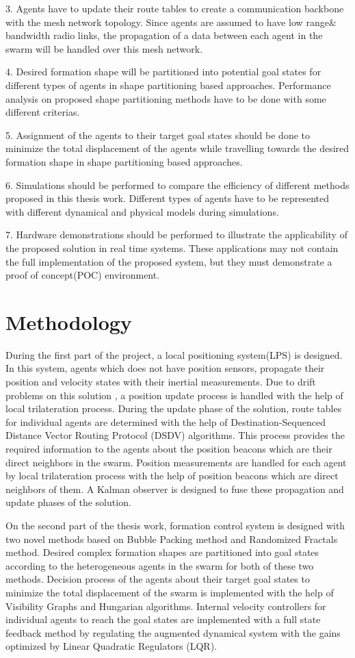 3. Agents have to update their route tables to create a communication backbone with the mesh network topology. Since agents are assumed to have low range$\&$bandwidth radio links, the propagation of a data between each agent in the swarm will be handled over this mesh network. 

4. Desired formation shape will be partitioned into potential goal states for different types of agents in shape partitioning based approaches. Performance analysis on proposed shape partitioning methods have to be done with some different criterias. 

5. Assignment of the agents to their target goal states should be done to minimize the total displacement of the agents while travelling towards the desired formation shape in shape partitioning based approaches. 

6. Simulations should be performed to compare the efficiency of different methods proposed in this thesis work. Different types of agents have to be represented with different dynamical and physical models during simulations.

7. Hardware demonstrations should be performed to illustrate the applicability of the proposed solution in real time systems. These applications may not contain the full implementation of the proposed system, but they must demonstrate a proof of concept(POC) environment.

\section{Methodology}
During the first part of the project, a local positioning system(LPS) is designed. In this system, agents which does not have position sensors, propagate their position and velocity states with their inertial measurements. Due to  drift problems on this solution \cite{91}, a position update process is handled with the help of local trilateration process. During the update phase of the solution, route tables for individual agents are determined with the help of Destination-Sequenced Distance Vector Routing Protocol (DSDV) algorithms. This process provides the required information to the agents about the position beacons which are their direct neighbors in the swarm. Position measurements are handled for each agent by local trilateration process with the help of position beacons which are direct neighbors of them. A Kalman observer is designed to fuse these propagation and update phases of the solution.

On the second part of the thesis work, formation control system is designed with two novel methods based on Bubble Packing method and Randomized Fractals method. Desired complex formation shapes are partitioned into goal states according to the heterogeneous agents in the swarm for both of these two methods. Decision process of the agents about their target goal states to minimize the total displacement of the swarm is implemented with the help of Visibility Graphs and Hungarian algorithms. Internal velocity controllers for individual agents to reach the goal states are implemented with a full state feedback method by regulating the augmented dynamical system with the gains optimized by Linear Quadratic Regulators (LQR).

